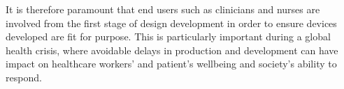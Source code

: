 \documentclass[12pt]{article}
\begin{document}
It is therefore paramount that end users such as clinicians and nurses are involved from the first stage of design development in order to ensure devices developed are fit for purpose. This is particularly important during a global health crisis, where avoidable delays in production and development can have impact on healthcare workers’ and patient’s wellbeing and society’s ability to respond. 
\end{document}
